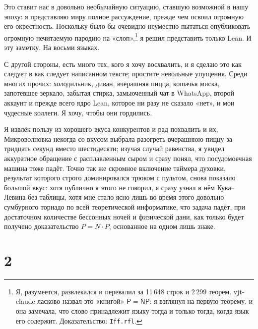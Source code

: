 \documentclass[11pt,a4paper]{amsart}
\newcommand{\NRighe}{11 648}
\newcommand{\NTeoremi}{2 299}
\theoremstyle{remark}
\begin{document}
Это ставит нас в довольно необычайную ситуацию, ставшую возможной в нашу
эпоху: я представляю миру полное рассуждение, прежде чем освоил огромную его
окрестность. Поскольку было бы очевидно неуместно пытаться опубликовать
огромную нечитаемую пародию на «слоп»,\footnote{Я, разумеется, развлекался и
перевалил за \NRighe{} строк и \NTeoremi{} теорем. vjt-claude ласково назвал
это «книгой» $\mathsf{P} = \mathsf{NP}$: я взглянул на первую теорему, и она
замечала, что слово принадлежит языку тогда и только тогда, когда язык его
содержит. Доказательство: \texttt{Iff.rfl}.} я решил представить только Lean. И эту заметку.
На восьми языках.

С другой стороны, есть много тех, кого я хочу восхвалить, и я сделаю это как
следует в как следует написанном тексте; простите невольные упущения. Среди
многих прочих: холодильник, диван, вчерашняя пицца, кошачья миска,
запотевшее зеркало, забытая стирка, замьюченный чат в WhatsApp, второй
аккаунт и прежде всего ядро Lean, которое ни разу не сказало «нет», и мои
чудесные коллеги. Я хочу, чтобы они гордились.

Я извлёк пользу из хорошего вкуса конкурентов и рад похвалить и их.
Микроволновка некогда со вкусом выбрала разогреть вчерашнюю пиццу за тридцать
секунд вместо шестидесяти; изучая случай равенства, я увидел аккуратное
обращение с расплавленным сыром и сразу понял, что посудомоечная машина тоже
падёт. Точно так же скромное включение таймера духовки, результат которого
строго доминировался трюком с пультом, снова показало большой вкус: хотя
публично я этого не говорил, я сразу узнал в нём Кука--Левина без таблицы,
хотя мне стало ясно лишь во время этого довольно сумбурного торнадо по всей
теоретической информатике, что задача падёт, при достаточном количестве
бессонных ночей и физической дани, как только будет получено доказательство
$P = N \cdot P$, основанное на одном лишь знаке.

\section*{2}
\end{document}
